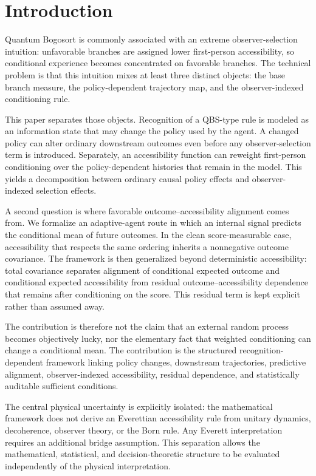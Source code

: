 \section{Introduction}

Quantum Bogosort is commonly associated with an extreme observer-selection intuition: unfavorable branches are assigned lower first-person accessibility, so conditional experience becomes concentrated on favorable branches. The technical problem is that this intuition mixes at least three distinct objects: the base branch measure, the policy-dependent trajectory map, and the observer-indexed conditioning rule.

This paper separates those objects. Recognition of a QBS-type rule is modeled as an information state that may change the policy used by the agent. A changed policy can alter ordinary downstream outcomes even before any observer-selection term is introduced. Separately, an accessibility function can reweight first-person conditioning over the policy-dependent histories that remain in the model. This yields a decomposition between ordinary causal policy effects and observer-indexed selection effects.

A second question is where favorable outcome--accessibility alignment comes from. We formalize an adaptive-agent route in which an internal signal predicts the conditional mean of future outcomes. In the clean score-measurable case, accessibility that respects the same ordering inherits a nonnegative outcome covariance. The framework is then generalized beyond deterministic accessibility: total covariance separates alignment of conditional expected outcome and conditional expected accessibility from residual outcome--accessibility dependence that remains after conditioning on the score. This residual term is kept explicit rather than assumed away.

The contribution is therefore not the claim that an external random process becomes objectively lucky, nor the elementary fact that weighted conditioning can change a conditional mean. The contribution is the structured recognition-dependent framework linking policy changes, downstream trajectories, predictive alignment, observer-indexed accessibility, residual dependence, and statistically auditable sufficient conditions.

The central physical uncertainty is explicitly isolated: the mathematical framework does not derive an Everettian accessibility rule from unitary dynamics, decoherence, observer theory, or the Born rule. Any Everett interpretation requires an additional bridge assumption. This separation allows the mathematical, statistical, and decision-theoretic structure to be evaluated independently of the physical interpretation.

